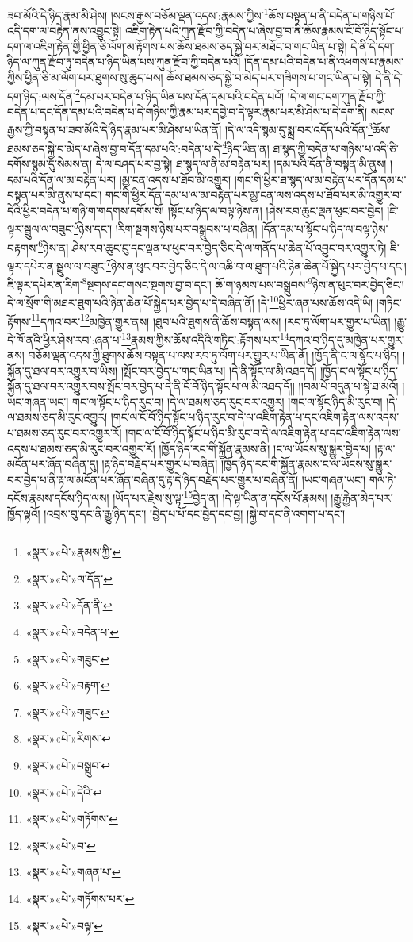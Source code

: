 ཟབ་མོའི་དེ་ཉིད་རྣམ་མི་ཤེས། །སངས་རྒྱས་བཅོམ་ལྡན་འདས་:རྣམས་ཀྱིས་\footnote{«སྣར་»«པེ་»རྣམས་ཀྱི་}ཆོས་བསྟན་པ་ནི་བདེན་པ་གཉིས་པོ་འདི་དག་ལ་བརྟེན་ནས་འབྱུང་སྟེ། འཇིག་རྟེན་པའི་ཀུན་རྫོབ་ཀྱི་བདེན་པ་ཞེས་བྱ་བ་ནི་ཆོས་རྣམས་ངོ་བོ་ཉིད་སྟོང་པ་དག་ལ་འཇིག་རྟེན་གྱི་ཕྱིན་ཅི་ལོག་མ་རྟོགས་པས་ཆོས་ཐམས་ཅད་སྐྱེ་བར་མཐོང་བ་གང་ཡིན་པ་སྟེ། དེ་ནི་དེ་དག་ཉིད་ལ་ཀུན་རྫོབ་ཏུ་བདེན་པ་ཉིད་ཡིན་པས་ཀུན་རྫོབ་ཀྱི་བདེན་པའོ། །དོན་དམ་པའི་བདེན་པ་ནི་འཕགས་པ་རྣམས་ཀྱིས་ཕྱིན་ཅི་མ་ལོག་པར་ཐུགས་སུ་ཆུད་པས། ཆོས་ཐམས་ཅད་སྐྱེ་བ་མེད་པར་གཟིགས་པ་གང་ཡིན་པ་སྟེ། དེ་ནི་དེ་དག་ཉིད་:ལས་དོན་\footnote{«སྣར་»«པེ་»ལ་དོན་}དམ་པར་བདེན་པ་ཉིད་ཡིན་པས་དོན་དམ་པའི་བདེན་པའོ། །དེ་ལ་གང་དག་ཀུན་རྫོབ་ཀྱི་བདེན་པ་དང་དོན་དམ་པའི་བདེན་པ་དེ་གཉིས་ཀྱི་རྣམ་པར་དབྱེ་བ་དེ་ལྟར་རྣམ་པར་མི་ཤེས་པ་དེ་དག་ནི། སངས་རྒྱས་ཀྱི་བསྟན་པ་ཟབ་མོའི་དེ་ཉིད་རྣམ་པར་མི་ཤེས་པ་ཡིན་ནོ། །དེ་ལ་འདི་སྙམ་དུ་སྨྲ་བར་འདོད་པའི་དོན་\footnote{«སྣར་»«པེ་»དོན་ནི་}ཆོས་ཐམས་ཅད་སྐྱེ་བ་མེད་པ་ཞེས་བྱ་བ་དོན་དམ་པའི་:བདེན་པ་དེ་\footnote{«སྣར་»«པེ་»བདེན་པ་}ཉིད་ཡིན་ན། ཐ་སྙད་ཀྱི་བདེན་པ་གཉིས་པ་འདི་ཅི་དགོས་སྙམ་དུ་སེམས་ན། དེ་ལ་བཤད་པར་བྱ་སྟེ། ཐ་སྙད་ལ་ནི་མ་བརྟེན་པར། །དམ་པའི་དོན་ནི་བསྟན་མི་ནུས། །དམ་པའི་དོན་ལ་མ་བརྟེན་པར། །མྱ་ངན་འདས་པ་ཐོབ་མི་འགྱུར། །གང་གི་ཕྱིར་ཐ་སྙད་ལ་མ་བརྟེན་པར་དོན་དམ་པ་བསྟན་པར་མི་ནུས་པ་དང་། གང་གི་ཕྱིར་དོན་དམ་པ་ལ་མ་བརྟེན་པར་མྱ་ངན་ལས་འདས་པ་ཐོབ་པར་མི་འགྱུར་བ་དེའི་ཕྱིར་བདེན་པ་གཉི་ག་གདགས་དགོས་སོ། །སྟོང་པ་ཉིད་ལ་བལྟ་ཉེས་ན། །ཤེས་རབ་ཆུང་ལྡན་ཕུང་བར་བྱེད། །ཇི་ལྟར་སྦྲུལ་ལ་བཟུང་\footnote{«སྣར་»«པེ་»གཟུང་}ཉེས་དང་། །རིག་སྔགས་ཉེས་པར་བསྒྲུབས་པ་བཞིན། །དོན་དམ་པ་སྟོང་པ་ཉིད་ལ་བལྟ་ཉེས་བརྟགས་\footnote{«སྣར་»«པེ་»བརྟག་}ཉེས་ན། ཤེས་རབ་ཆུང་ངུ་དང་ལྡན་པ་ཕུང་བར་བྱེད་ཅིང་དེ་ལ་གནོད་པ་ཆེན་པོ་འབྱུང་བར་འགྱུར་ཏེ། ཇི་ལྟར་དཔེར་ན་སྦྲུལ་ལ་བཟུང་\footnote{«སྣར་»«པེ་»གཟུང་}ཉེས་ན་ཕུང་བར་བྱེད་ཅིང་དེ་ལ་འཆི་བ་ལ་ཐུག་པའི་ཉེན་ཆེན་པོ་སྐྱེད་པར་བྱེད་པ་དང་། ཇི་ལྟར་དཔེར་ན་རིག་\footnote{«སྣར་»«པེ་»རིགས་}སྔགས་དང་གསང་སྔགས་བྱ་བ་དང་། ཆོ་ག་ཉམས་པས་བསྒྲུབས་\footnote{«སྣར་»«པེ་»བསྒྲུབ་}ཉེས་ན་ཕུང་བར་བྱེད་ཅིང་། དེ་ལ་སྲོག་གི་མཐར་ཐུག་པའི་ཉེན་ཆེན་པོ་སྐྱེད་པར་བྱེད་པ་དེ་བཞིན་ནོ། །དེ་\footnote{«སྣར་»«པེ་»དེའི་}ཕྱིར་ཞན་པས་ཆོས་འདི་ཡི། །གཏིང་རྟོགས་\footnote{«སྣར་»«པེ་»གཏོགས་}དཀའ་བར་\footnote{«སྣར་»«པེ་»བ་}མཁྱེན་གྱུར་ནས། །ཐུབ་པའི་ཐུགས་ནི་ཆོས་བསྟན་ལས། །རབ་ཏུ་ལོག་པར་གྱུར་པ་ཡིན། །རྒྱུ་དེ་ཁོ་ནའི་ཕྱིར་ཤེས་རབ་:ཞན་པ་\footnote{«སྣར་»«པེ་»གཞན་པ་}རྣམས་ཀྱིས་ཆོས་འདིའི་གཏིང་:རྟོགས་པར་\footnote{«སྣར་»«པེ་»གཏོགས་པར་}དཀའ་བ་ཉིད་དུ་མཁྱེན་པར་གྱུར་ནས། བཅོམ་ལྡན་འདས་ཀྱི་ཐུགས་ཆོས་བསྟན་པ་ལས་རབ་ཏུ་ལོག་པར་གྱུར་པ་ཡིན་ནོ། །ཁྱོད་ནི་ང་ལ་སྟོང་པ་ཉིད། །སྐྱོན་དུ་ཐལ་བར་འགྱུར་བ་ཡིས། །སྤོང་བར་བྱེད་པ་གང་ཡིན་པ། །དེ་ནི་སྟོང་ལ་མི་འཐད་དོ། །ཁྱོད་ང་ལ་སྟོང་པ་ཉིད་སྐྱོན་དུ་ཐལ་བར་འགྱུར་བས་སྤོང་བར་བྱེད་པ་དེ་ནི་ངོ་བོ་ཉིད་སྟོང་པ་ལ་མི་འཐད་དོ།། །།བམ་པོ་བདུན་པ་སྟེ་ཐ་མའོ། །ཡང་གཞན་ཡང་། གང་ལ་སྟོང་པ་ཉིད་རུང་བ། །དེ་ལ་ཐམས་ཅད་རུང་བར་འགྱུར། །གང་ལ་སྟོང་ཉིད་མི་རུང་བ། །དེ་ལ་ཐམས་ཅད་མི་རུང་འགྱུར། །གང་ལ་ངོ་བོ་ཉིད་སྟོང་པ་ཉིད་རུང་བ་དེ་ལ་འཇིག་རྟེན་པ་དང་འཇིག་རྟེན་ལས་འདས་པ་ཐམས་ཅད་རུང་བར་འགྱུར་རོ། །གང་ལ་ངོ་བོ་ཉིད་སྟོང་པ་ཉིད་མི་རུང་བ་དེ་ལ་འཇིག་རྟེན་པ་དང་འཇིག་རྟེན་ལས་འདས་པ་ཐམས་ཅད་མི་རུང་བར་འགྱུར་རོ། །ཁྱོད་ཉིད་རང་གི་སྐྱོན་རྣམས་ནི། །ང་ལ་ཡོངས་སུ་སྒྱུར་བྱེད་པ། །རྟ་ལ་མངོན་པར་ཞོན་བཞིན་དུ། །རྟ་ཉིད་བརྗེད་པར་གྱུར་པ་བཞིན། །ཁྱོད་ཉིད་རང་གི་སྐྱོན་རྣམས་ང་ལ་ཡོངས་སུ་སྒྱུར་བར་བྱེད་པ་ནི་རྟ་ལ་མངོན་པར་ཞོན་བཞིན་དུ་རྟ་དེ་ཉིད་བརྗེད་པར་གྱུར་པ་བཞིན་ནོ། །ཡང་གཞན་ཡང་། གལ་ཏེ་དངོས་རྣམས་དངོས་ཉིད་ལས། །ཡོད་པར་རྗེས་སུ་ལྟ་\footnote{«སྣར་»«པེ་»བལྟ་}བྱེད་ན། །དེ་ལྟ་ཡིན་ན་དངོས་པོ་རྣམས། །རྒྱུ་རྐྱེན་མེད་པར་ཁྱོད་ལྟའོ། །འབྲས་བུ་དང་ནི་རྒྱུ་ཉིད་དང་། །བྱེད་པ་པོ་དང་བྱེད་དང་བྱ། །སྐྱེ་བ་དང་ནི་འགག་པ་དང་། 